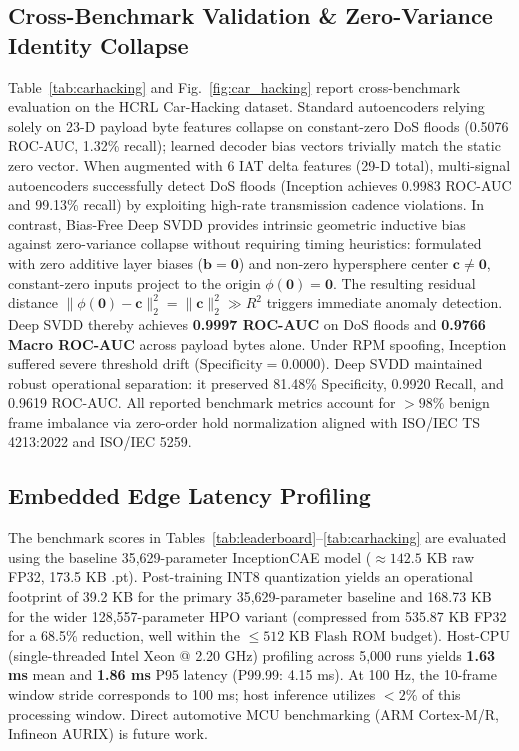 \documentclass[conference]{IEEEtran}
\begin{document}
\subsection{Cross-Benchmark Validation \& Zero-Variance Identity Collapse}
Table~\ref{tab:carhacking} and Fig.~\ref{fig:car_hacking} report cross-benchmark evaluation on the HCRL Car-Hacking dataset. Standard autoencoders relying solely on 23-D payload byte features collapse on constant-zero DoS floods (0.5076 ROC-AUC, 1.32\% recall); learned decoder bias vectors trivially match the static zero vector. When augmented with 6 IAT delta features (29-D total), multi-signal autoencoders successfully detect DoS floods (Inception achieves 0.9983 ROC-AUC and 99.13\% recall) by exploiting high-rate transmission cadence violations. In contrast, Bias-Free Deep SVDD provides intrinsic geometric inductive bias against zero-variance collapse without requiring timing heuristics: formulated with zero additive layer biases ($\mathbf{b}=\mathbf{0}$) and non-zero hypersphere center $\mathbf{c} \neq \mathbf{0}$, constant-zero inputs project to the origin $\phi(\mathbf{0}) = \mathbf{0}$. The resulting residual distance $\|\phi(\mathbf{0}) - \mathbf{c}\|_2^2 = \|\mathbf{c}\|_2^2 \gg R^2$ triggers immediate anomaly detection. Deep SVDD thereby achieves \textbf{0.9997 ROC-AUC} on DoS floods and \textbf{0.9766 Macro ROC-AUC} across payload bytes alone. Under RPM spoofing, Inception suffered severe threshold drift ($\text{Specificity}=0.0000$). Deep SVDD maintained robust operational separation: it preserved 81.48\% Specificity, 0.9920 Recall, and 0.9619 ROC-AUC. All reported benchmark metrics account for $>98\%$ benign frame imbalance via zero-order hold normalization aligned with ISO/IEC TS 4213:2022 and ISO/IEC 5259.

\subsection{Embedded Edge Latency Profiling}
The benchmark scores in Tables~\ref{tab:leaderboard}--\ref{tab:carhacking} are evaluated using the baseline 35,629-parameter InceptionCAE model ($\approx 142.5$ KB raw FP32, 173.5 KB .pt). Post-training INT8 quantization yields an operational footprint of 39.2 KB for the primary 35,629-parameter baseline and 168.73 KB for the wider 128,557-parameter HPO variant (compressed from 535.87 KB FP32 for a 68.5\% reduction, well within the $\le 512$ KB Flash ROM budget). Host-CPU (single-threaded Intel Xeon @ 2.20 GHz) profiling across 5,000 runs yields \textbf{1.63 ms} mean and \textbf{1.86 ms} P95 latency (P99.99: 4.15 ms). At 100 Hz, the 10-frame window stride corresponds to 100 ms; host inference utilizes $<2\%$ of this processing window. Direct automotive MCU benchmarking (ARM Cortex-M/R, Infineon AURIX) is future work.
\end{document}

